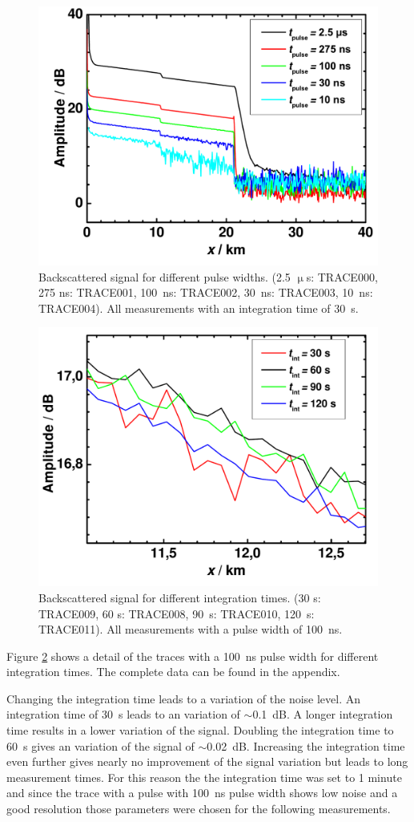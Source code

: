 \begin{figure}%
\centering
\includegraphics[width=.6\columnwidth]{grafiken/1_time.pdf}%
\caption{Backscattered signal for different pulse widths. (2.5 $\upmu$s: TRACE000, 275 ns: TRACE001, 100~ns: TRACE002, 30~ns: TRACE003, 10~ns: TRACE004). All measurements with an integration time of 30~s.}%
\label{fig:1_time}%
\end{figure}

\begin{figure}%
\centering
\includegraphics[width=.6\columnwidth]{grafiken/1_integration.pdf}%
\caption{Backscattered signal for different integration times. (30 s: TRACE009, 60 s: TRACE008, 90~s: TRACE010, 120~s: TRACE011). All measurements with a pulse width of 100~ns.}%
\label{fig:integration}%
\end{figure}

Figure \ref{fig:integration} shows a detail of the traces with a 100~ns pulse width for different integration times. The complete data can be found in the appendix.

Changing the integration time leads to a variation of the noise level. An integration time of 30~s leads to an variation of $\sim$0.1~dB. A longer integration time results in a lower variation of the signal. 
Doubling the integration time to 60~s gives an variation of the signal of $\sim$0.02~dB. Increasing the integration time even further gives nearly no improvement of the signal variation but leads to long measurement times.
For this reason the the integration time was set to 1 minute and since the trace with a pulse with 100~ns pulse width shows low noise and a good resolution those parameters were chosen for the following measurements.

